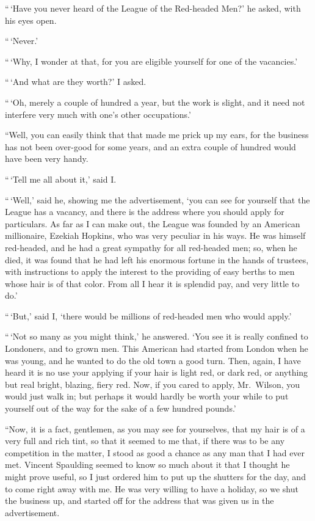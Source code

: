 “\,‘Have you never heard of the League of the Red-headed
Men?’ he asked, with his eyes open.

“\,‘Never.’

“\,‘Why, I wonder at that, for you are eligible yourself for
one of the vacancies.’

“\,‘And what are they worth?’ I asked.

“\,‘Oh, merely a couple of hundred a year, but the work is
slight, and it need not interfere very much with one’s other
occupations.’

“Well, you can easily think that that made me prick up my
ears, for the business has not been over-good for some years,
and an extra couple of hundred would have been very handy.

“\,‘Tell me all about it,’ said I.

“\,‘Well,’ said he, showing me the advertisement, ‘you can
see for yourself that the League has a vacancy, and there is
the address where you should apply for particulars. As far as
I can make out, the League was founded by an American
millionaire, Ezekiah Hopkins, who was very peculiar in his
ways. He was himself red-headed, and he had a great sympathy
for all red-headed men; so, when he died, it was found
that he had left his enormous fortune in the hands of trustees,
with instructions to apply the interest to the providing of easy
berths to men whose hair is of that color. From all I hear it
is splendid pay, and very little to do.’

“\,‘But,’ said I, ‘there would be millions of red-headed men
who would apply.’

“\,‘Not so many as you might think,’ he answered. ‘You
see it is really confined to Londoners, and to grown men.
This American had started from London when he was young,
and he wanted to do the old town a good turn. Then, again,
I have heard it is no use your applying if your hair is light
red, or dark red, or anything but real bright, blazing, fiery red.
Now, if you cared to apply, Mr.~Wilson, you would just walk in;
but perhaps it would hardly be worth your while to put yourself
out of the way for the sake of a few hundred pounds.’

“Now, it is a fact, gentlemen, as you may see for yourselves,
that my hair is of a very full and rich tint, so that it seemed
to me that, if there was to be any competition in the matter, I
stood as good a chance as any man that I had ever met.
Vincent Spaulding seemed to know so much about it that I
thought he might prove useful, so I just ordered him to put
up the shutters for the day, and to come right away with me.
He was very willing to have a holiday, so we shut the business
up, and started off for the address that was given us in the
advertisement.

